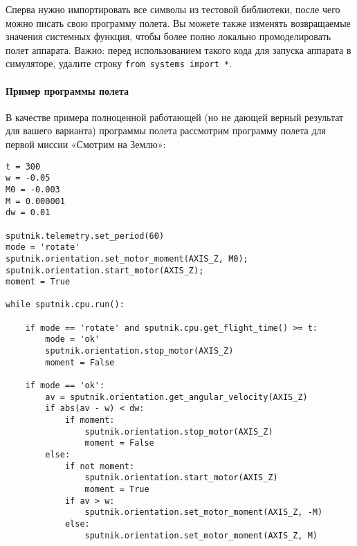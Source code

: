 \documentclass[12pt,a4paper]{article}
\begin{document}
Сперва нужно импортировать все символы из тестовой библиотеки, после чего можно писать
свою программу полета. Вы можете также изменять возвращаемые значения системных функция,
чтобы более полно локально промоделировать полет аппарата.  Важно: перед использованием
такого кода для запуска аппарата в симуляторе, удалите строку
\verb'from systems import *'.

\paragraph{Пример программы полета}

В качестве примера полноценной работающей (но не дающей верный результат для вашего
варианта) программы полета рассмотрим программу полета для  первой миссии «Смотрим на
Землю»:

\begin{verbatim}
t = 300
w = -0.05
M0 = -0.003
M = 0.000001
dw = 0.01

sputnik.telemetry.set_period(60)
mode = 'rotate'
sputnik.orientation.set_motor_moment(AXIS_Z, M0);
sputnik.orientation.start_motor(AXIS_Z);
moment = True

while sputnik.cpu.run():

    if mode == 'rotate' and sputnik.cpu.get_flight_time() >= t: 
        mode = 'ok'
        sputnik.orientation.stop_motor(AXIS_Z)
        moment = False

    if mode == 'ok':
        av = sputnik.orientation.get_angular_velocity(AXIS_Z)
        if abs(av - w) < dw:
            if moment:
                sputnik.orientation.stop_motor(AXIS_Z)
                moment = False
        else:
            if not moment:
                sputnik.orientation.start_motor(AXIS_Z)
                moment = True
            if av > w:
                sputnik.orientation.set_motor_moment(AXIS_Z, -M)
            else:
                sputnik.orientation.set_motor_moment(AXIS_Z, M)
\end{verbatim}
\end{document}

